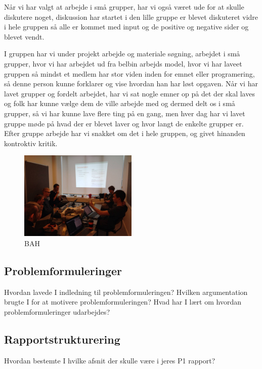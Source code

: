 \documentclass[a4paper,12pt,twoside,openright]{memoir}
\begin{document}
            Når vi har valgt at arbejde i små grupper, har vi også været ude for at skulle diskutere noget, diskussion har startet i den lille gruppe er blevet diskuteret vidre i hele gruppen så alle er kommet med input og de positive og negative sider og blevet vendt.

            I gruppen har vi under projekt arbejde og materiale søgning, arbejdet i små grupper, hvor vi har arbejdet ud fra belbin arbejds model, hvor vi har laveet  gruppen så mindst et medlem har stor viden inden for emnet eller programering, så denne person kunne forklarer og vise hvordan han har løst opgaven. 
            Når vi har lavet grupper og fordelt arbejdet, har vi sat nogle emner op på det der skal laves og folk har kunne vælge dem de ville arbejde med og dermed delt os i små grupper, så vi har kunne lave flere ting på en gang, men hver dag har vi lavet gruppe møde på hvad der er blevet laver  og hvor langt de enkelte grupper er. Efter gruppe arbejde har vi snakket om det i hele gruppen, og givet  hinanden kontroktiv kritik.

            \begin{figure}[ht!]
                \centering
                \includegraphics[width=0.5\textwidth]{Images/8.jpg}
                \caption{BAH}
                \label{4}
            \end{figure}

        

        \subsection{Problemformuleringer}
        Hvordan lavede I indledning til problemformuleringen?
        Hvilken argumentation brugte I for at motivere problemformuleringen?
        Hvad har I lært om hvordan problemformuleringer udarbejdes?

        \subsection{Rapportstrukturering}
        Hvordan bestemte I hvilke afsnit der skulle være i jeres P1 rapport?
\end{document}
